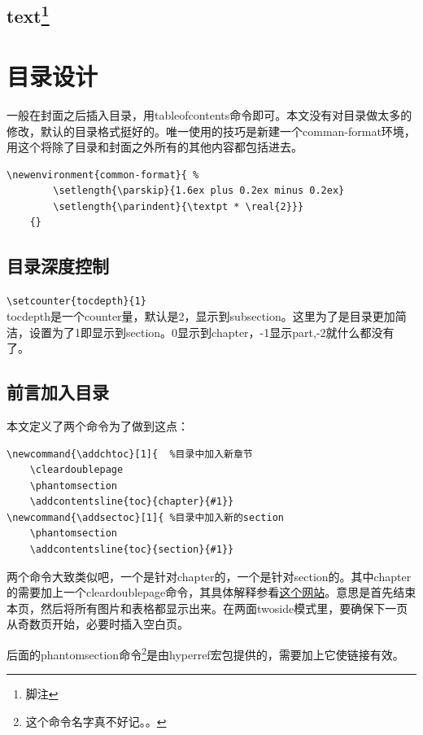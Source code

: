 \documentclass[12pt,oneside]{book}
\newlength{\textpt}
\begin{document}
\begin{common-format}
\subsection[text]{{\color{red}    text}\footnote{脚注}}







\section{目录设计}
一般在封面之后插入目录，用tableofcontents命令即可。本文没有对目录做太多的修改，默认的目录格式挺好的。唯一使用的技巧是新建一个comman-format环境，用这个将除了目录和封面之外所有的其他内容都包括进去。
\begin{Verbatim}
\newenvironment{common-format}{ %
        \setlength{\parskip}{1.6ex plus 0.2ex minus 0.2ex}  
        \setlength{\parindent}{\textpt * \real{2}}}
    {}
\end{Verbatim}

\subsection{目录深度控制}
\verb+\setcounter{tocdepth}{1} +\\
tocdepth是一个counter量，默认是2，显示到subsection。这里为了是目录更加简洁，设置为了1即显示到section。0显示到chapter，-1显示part,-2就什么都没有了。

\subsection{前言加入目录}
\label{sec:前言加入目录}
本文定义了两个命令为了做到这点：
\begin{Verbatim}
\newcommand{\addchtoc}[1]{  %目录中加入新章节
	\cleardoublepage   
	\phantomsection    
	\addcontentsline{toc}{chapter}{#1}}
\newcommand{\addsectoc}[1]{ %目录中加入新的section
	\phantomsection    
	\addcontentsline{toc}{section}{#1}}	
\end{Verbatim}
两个命令大致类似吧，一个是针对chapter的，一个是针对section的。其中chapter的需要加上一个cleardoublepage命令，其具体解释参看\href{http://www.personal.ceu.hu/tex/breaking.htm#clrdblpage}{这个网站}。意思是首先结束本页，然后将所有图片和表格都显示出来。在两面twoside模式里，要确保下一页从奇数页开始，必要时插入空白页。

后面的phantomsection命令\footnote{这个命令名字真不好记。。}是由hyperref宏包提供的，需要加上它使链接有效。     


\end{common-format}
\end{document}
